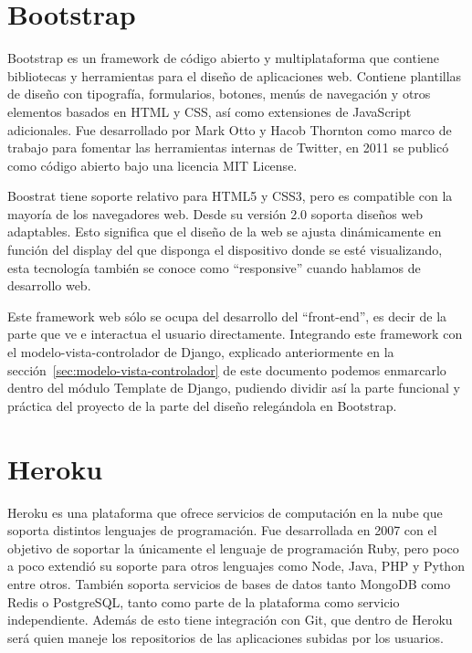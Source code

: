 \documentclass[a4paper, 12pt]{book}
\begin{document}
\section{Bootstrap}
\label{sec:bootstrap}
Bootstrap es un framework de código abierto y multiplataforma que contiene bibliotecas y herramientas para el diseño de aplicaciones web. Contiene plantillas de diseño con tipografía, formularios, botones, menús de navegación y otros elementos basados en HTML y CSS, así como extensiones de JavaScript adicionales. Fue desarrollado por Mark Otto y Hacob Thornton como marco de trabajo para fomentar las herramientas internas de Twitter, en 2011 se publicó como código abierto bajo una licencia MIT License.

Boostrat tiene soporte relativo para HTML5 y CSS3, pero es compatible con la mayoría de los navegadores web. Desde su versión 2.0 soporta diseños web adaptables. Esto significa que el diseño de la web se ajusta dinámicamente en función del display del que disponga el dispositivo donde se esté visualizando, esta tecnología también se conoce como ``responsive'' cuando hablamos de desarrollo web.

Este framework web sólo se ocupa del desarrollo del ``front-end'', es decir de la parte que ve e interactua el usuario directamente. Integrando este framework con el modelo-vista-controlador de Django, explicado anteriormente en la sección~\ref{sec:modelo-vista-controlador} de este documento podemos enmarcarlo dentro del módulo Template de Django, pudiendo dividir así la parte funcional y práctica del proyecto de la parte del diseño relegándola en Bootstrap. 

\section{Heroku}
\label{sec:heroku}

Heroku es una plataforma que ofrece servicios de computación en la nube que soporta distintos lenguajes de programación. Fue desarrollada en 2007 con el objetivo de soportar la únicamente el lenguaje de programación Ruby, pero poco a poco extendió su soporte para otros lenguajes como Node, Java, PHP y Python entre otros. También soporta servicios de bases de datos tanto MongoDB como Redis o PostgreSQL, tanto como parte de la plataforma como servicio independiente. Además de esto tiene integración con Git, que dentro de Heroku será quien maneje los repositorios de las aplicaciones subidas por los usuarios. 
\end{document}
